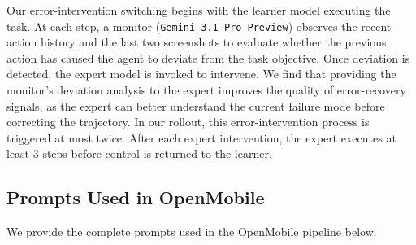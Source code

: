 \documentclass{article} %
\begin{document}
Our error-intervention switching begins with the learner model executing the task.
At each step, a monitor (\texttt{Gemini-3.1-Pro-Preview}) observes the recent action history and the last two screenshots to evaluate whether the previous action has caused the agent to deviate from the task objective.
Once deviation is detected, the expert model is invoked to intervene.
We find that providing the monitor's deviation analysis to the expert improves the quality of error-recovery signals, as the expert can better understand the current failure mode before correcting the trajectory.
In our rollout, this error-intervention process is triggered at most twice.
After each expert intervention, the expert executes at least 3 steps before control is returned to the learner.

\subsection{Prompts Used in OpenMobile}
\label{app:prompt}
We provide the complete prompts used in the OpenMobile pipeline below.
\end{document}
